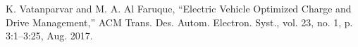

%
%


%
%
%
%
%

K. Vatanparvar and M. A. Al Faruque, ``Electric Vehicle Optimized Charge and Drive Management,'' ACM Trans. Des. Autom. Electron. Syst., vol. 23, no. 1, p. 3:1--3:25, Aug. 2017.


